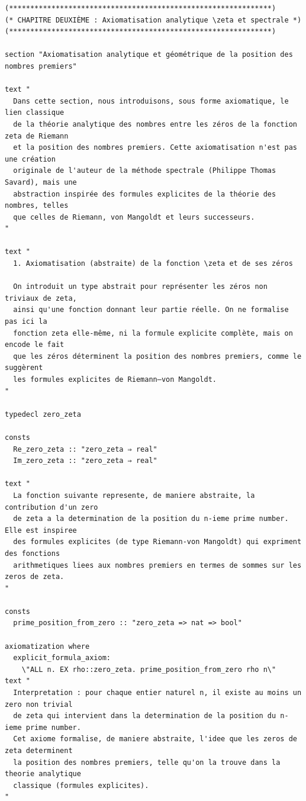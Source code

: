 \documentclass[a4paper,11pt]{article}
\begin{document}
\begin{holcode}[title={\textcolor{white}{File: methode\_spectral.thy -- Part 6/6 (END)}}]
\begin{lstlisting}
(**************************************************************)
(* CHAPITRE DEUXIÈME : Axiomatisation analytique \zeta et spectrale *)
(**************************************************************)

section "Axiomatisation analytique et géométrique de la position des nombres premiers"

text "
  Dans cette section, nous introduisons, sous forme axiomatique, le lien classique
  de la théorie analytique des nombres entre les zéros de la fonction zeta de Riemann
  et la position des nombres premiers. Cette axiomatisation n'est pas une création
  originale de l'auteur de la méthode spectrale (Philippe Thomas Savard), mais une
  abstraction inspirée des formules explicites de la théorie des nombres, telles
  que celles de Riemann, von Mangoldt et leurs successeurs.
"

text "
  1. Axiomatisation (abstraite) de la fonction \zeta et de ses zéros

  On introduit un type abstrait pour représenter les zéros non triviaux de zeta,
  ainsi qu'une fonction donnant leur partie réelle. On ne formalise pas ici la
  fonction zeta elle-même, ni la formule explicite complète, mais on encode le fait
  que les zéros déterminent la position des nombres premiers, comme le suggèrent
  les formules explicites de Riemann–von Mangoldt.
"

typedecl zero_zeta

consts
  Re_zero_zeta :: "zero_zeta ⇒ real"
  Im_zero_zeta :: "zero_zeta ⇒ real"

text "
  La fonction suivante represente, de maniere abstraite, la contribution d'un zero
  de zeta a la determination de la position du n-ieme prime number. Elle est inspiree
  des formules explicites (de type Riemann-von Mangoldt) qui expriment des fonctions
  arithmetiques liees aux nombres premiers en termes de sommes sur les zeros de zeta.
"

consts
  prime_position_from_zero :: "zero_zeta => nat => bool"

axiomatization where
  explicit_formula_axiom:
    \"ALL n. EX rho::zero_zeta. prime_position_from_zero rho n\"
text "
  Interpretation : pour chaque entier naturel n, il existe au moins un zero non trivial
  de zeta qui intervient dans la determination de la position du n-ieme prime number.
  Cet axiome formalise, de maniere abstraite, l'idee que les zeros de zeta determinent
  la position des nombres premiers, telle qu'on la trouve dans la theorie analytique
  classique (formules explicites).
"


\end{lstlisting}
\end{holcode}
\end{document}
